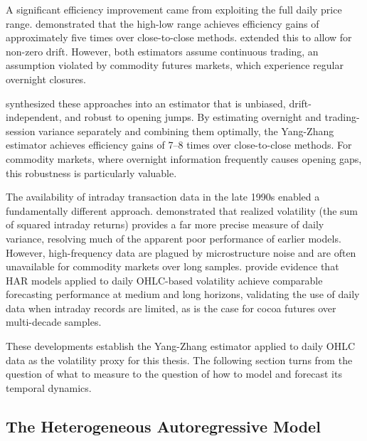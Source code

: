 A significant efficiency improvement came from exploiting the full daily
price range. \textcite{parkinson1980extreme} demonstrated that the
high-low range achieves efficiency gains of approximately five times
over close-to-close methods. \textcite{rogers1991estimating} extended
this to allow for non-zero drift. However, both estimators assume
continuous trading, an assumption violated by commodity futures
markets, which experience regular overnight closures.

\textcite{yangDriftIndependentVolatility2000} synthesized these
approaches into an estimator that is unbiased, drift-independent, and
robust to opening jumps. By estimating overnight and trading-session
variance separately and combining them optimally, the Yang-Zhang
estimator achieves efficiency gains of 7--8 times over close-to-close
methods. For commodity markets, where overnight information frequently
causes opening gaps, this robustness is particularly valuable.

The availability of intraday transaction data in the late 1990s enabled
a fundamentally different approach.
\textcite{andersen1998answering, andersen2001distribution} demonstrated
that realized volatility (the sum of squared intraday returns) provides
a far more precise measure of daily variance, resolving much of the
apparent poor performance of earlier models. However, high-frequency
data are plagued by microstructure noise and are often unavailable for
commodity markets over long samples.
\textcite{clementsHarvestingHARXVolatility2024} provide evidence that
HAR models applied to daily OHLC-based volatility achieve comparable
forecasting performance at medium and long horizons, validating the use
of daily data when intraday records are limited, as is the case for
cocoa futures over multi-decade samples.

These developments establish the Yang-Zhang estimator applied to daily
OHLC data as the volatility proxy for this thesis. The following section
turns from the question of what to measure to the question of how to
model and forecast its temporal dynamics.

\subsection{The Heterogeneous Autoregressive Model}
\label{sec:lit-har}

